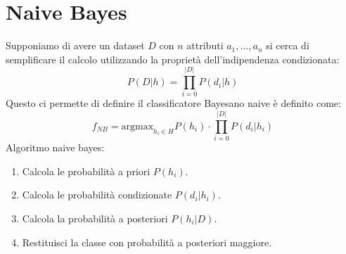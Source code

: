 \section{Naive Bayes}
Supponiamo di avere un dataset $D$ con $n$ attributi $a_1, \dots, a_n$ si cerca
di semplificare il calcolo utilizzando la proprietà dell'indipendenza condizionata:
\begin{equation}
    P(D|h) = \prod_{i = 0}^{|D|} P(d_i|h)
\end{equation}
Questo ci permette di definire il classificatore Bayesano naive è definito come:
\begin{equation}
    f_{NB} = \text{argmax}_{h_i \in H} P(h_i) \cdot \prod_{i = 0}^{|D|} P(d_i|h_i)
\end{equation}
Algoritmo naive bayes:
\begin{enumerate}
    \item Calcola le probabilità a priori $P(h_i)$.
    \item Calcola le probabilità condizionate $P(d_i|h_i)$.
    \item Calcola la probabilità a posteriori $P(h_i|D)$.
    \item Restituisci la classe con probabilità a posteriori maggiore.
\end{enumerate}
